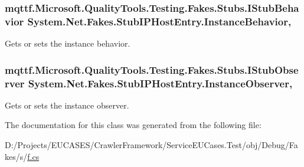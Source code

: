 \hypertarget{class_system_1_1_net_1_1_fakes_1_1_stub_i_p_host_entry_aa5934ce50110dc58dcb2920201f62fee}{
\subsubsection[{Instance\-Behavior}]{\setlength{\rightskip}{0pt plus 5cm}mqttf.\-Microsoft.\-Quality\-Tools.\-Testing.\-Fakes.\-Stubs.\-I\-Stub\-Behavior System.\-Net.\-Fakes.\-Stub\-I\-P\-Host\-Entry.\-Instance\-Behavior\hspace{0.3cm}{\ttfamily [get]}, {\ttfamily [set]}}}\label{class_system_1_1_net_1_1_fakes_1_1_stub_i_p_host_entry_aa5934ce50110dc58dcb2920201f62fee}


Gets or sets the instance behavior.

\hypertarget{class_system_1_1_net_1_1_fakes_1_1_stub_i_p_host_entry_ad0acecc7aa39106c5df7d0558d5b7fdc}{
\subsubsection[{Instance\-Observer}]{\setlength{\rightskip}{0pt plus 5cm}mqttf.\-Microsoft.\-Quality\-Tools.\-Testing.\-Fakes.\-Stubs.\-I\-Stub\-Observer System.\-Net.\-Fakes.\-Stub\-I\-P\-Host\-Entry.\-Instance\-Observer\hspace{0.3cm}{\ttfamily [get]}, {\ttfamily [set]}}}\label{class_system_1_1_net_1_1_fakes_1_1_stub_i_p_host_entry_ad0acecc7aa39106c5df7d0558d5b7fdc}


Gets or sets the instance observer.



The documentation for this class was generated from the following file\-:\begin{DoxyCompactItemize}
\item 
D\-:/\-Projects/\-E\-U\-C\-A\-S\-E\-S/\-Crawler\-Framework/\-Service\-E\-U\-Cases.\-Test/obj/\-Debug/\-Fakes/s/\hyperlink{s_2f_8cs}{f.\-cs}\end{DoxyCompactItemize}
